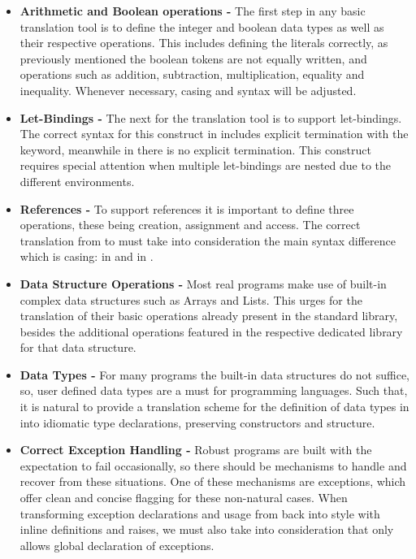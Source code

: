 \begin{itemize}

\item \textbf{Arithmetic and Boolean operations -} The first step in any basic translation tool is to define the integer and boolean 
data types as well as their respective operations.
This includes defining the literals correctly, as previously mentioned the boolean tokens are not equally written, and operations
such as addition, subtraction, multiplication, equality and inequality. Whenever necessary, casing and syntax will be adjusted.

\item \textbf{Let-Bindings -} The next for the translation tool is to support let-bindings. The correct syntax for this construct in 
\cml includes explicit 
termination with the  keyword, meanwhile in \ocaml there is no explicit termination. This construct requires 
special attention when multiple let-bindings are nested due to the different environments.

\item \textbf{References -} To support references it is important to define three operations, these being creation, assignment and 
access. The correct translation
from \cml to \ocaml must take into consideration the main syntax difference which is casing:  in \ocaml
and  in \cml.

\item \textbf{Data Structure Operations -} Most real programs make use of built-in complex data structures such as Arrays and Lists. 
This urges for the translation of their 
basic operations already present in the standard library, besides the additional operations featured in the respective dedicated 
library for that data structure.

\item \textbf{Data Types -} For many programs the built-in data structures do not suffice, so, user defined data types are a must 
for programming languages.
Such that, it is natural to provide a translation scheme for the definition of data types in \cml into idiomatic \ocaml type declarations, 
preserving constructors and structure.

\item \textbf{Correct Exception Handling -} Robust programs are built with the expectation to fail occasionally, so there should 
be mechanisms to handle and recover from these 
situations. One of these mechanisms are exceptions, which offer clean and concise flagging for these non-natural cases.
When transforming exception declarations and usage from \cml back into \ocaml style with inline definitions and raises, we must also take
into consideration that \cml only allows global declaration of exceptions.

\end{itemize}

